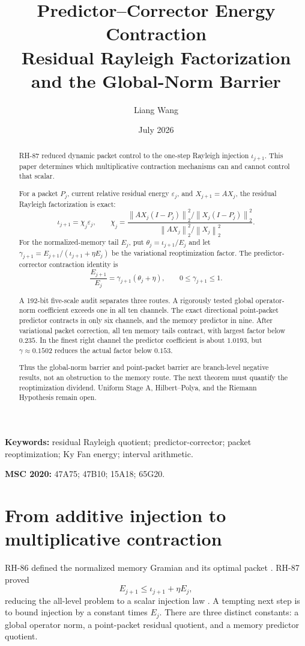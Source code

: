 \documentclass[11pt]{article}
\title{Predictor--Corrector Energy Contraction\\
\large Residual Rayleigh Factorization and the Global-Norm Barrier}
\author{Liang Wang}
\date{July 2026}
\theoremstyle{remark}
\newcommand{\norm}[1]{\left\lVert#1\right\rVert}
\begin{document}
\maketitle

\begin{abstract}
RH-87 reduced dynamic packet control to the one-step Rayleigh injection
$\iota_{j+1}$.  This paper determines which multiplicative contraction
mechanisms can and cannot control that scalar.

For a packet $P_j$, current relative residual energy $\varepsilon_j$, and
$X_{j+1}=AX_j$, the residual Rayleigh factorization is exact:
\[
 \iota_{j+1}=\chi_j\varepsilon_j,
 \qquad
 \chi_j=
 \frac{\norm{AX_j(I-P_j)}_2^2/\norm{X_j(I-P_j)}_2^2}
 {\norm{AX_j}_2^2/\norm{X_j}_2^2}.
\]
For the normalized-memory tail $E_j$, put
$\theta_j=\iota_{j+1}/E_j$ and let
$\gamma_{j+1}=E_{j+1}/(\iota_{j+1}+\eta E_j)$ be the variational
reoptimization factor.  The predictor-corrector contraction identity is
\[
 \frac{E_{j+1}}{E_j}=\gamma_{j+1}(\theta_j+\eta),
 \qquad 0\le\gamma_{j+1}\le1.
\]

A 192-bit five-scale audit separates three routes.  A rigorously tested
global operator-norm coefficient exceeds one in all ten channels.  The exact
directional point-packet predictor contracts in only six channels, and the
memory predictor in nine.  After variational packet correction, all ten
memory tails contract, with largest factor below $0.235$.  In the finest
right channel the predictor coefficient is about $1.0193$, but
$\gamma\approx0.1502$ reduces the actual factor below $0.153$.

Thus the global-norm barrier and point-packet barrier are branch-level
negative results, not an obstruction to the memory route.  The next theorem
must quantify the reoptimization dividend.  Uniform Stage A, Hilbert--Polya,
and the Riemann Hypothesis remain open.
\end{abstract}

\noindent\textbf{Keywords:} residual Rayleigh quotient; predictor-corrector;
packet reoptimization; Ky Fan energy; interval arithmetic.

\medskip
\noindent\textbf{MSC 2020:} 47A75; 47B10; 15A18; 65G20.

\section{From additive injection to multiplicative contraction}

RH-86 defined the normalized memory Gramian and its optimal packet
\citep{WangMemory2026}.  RH-87 proved
\begin{equation}
 E_{j+1}\le\iota_{j+1}+\eta E_j,
 \label{eq:rh87}
\end{equation}
reducing the all-level problem to a scalar injection law
\citep{WangInjection2026}.  A tempting next step is to bound injection by a
constant times $E_j$.  There are three distinct constants: a global operator
norm, a point-packet residual quotient, and a memory predictor quotient.
\end{document}
